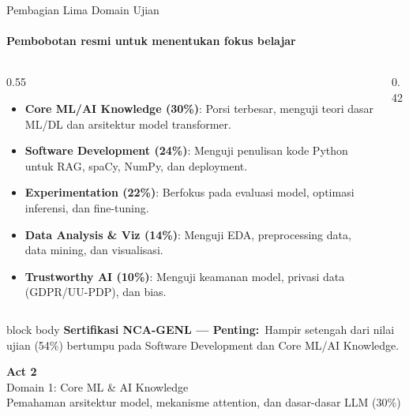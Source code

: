 \documentclass[aspectratio=169,t]{beamer}
\newcommand{\acttitle}[3]{%
  \begin{frame}[plain]
    \vspace{1.5cm}
    \begin{center}
      {\color{nvgreen}\Huge\bfseries Act #1}\\[1.2em]
      {\color{nvwhite}\Huge #2}\\[0.8em]
      {\color{nvgray}\Large #3}
    \end{center}
  \end{frame}%
}
\newcommand{\certnote}[2]{%
  \vspace{0.1em}
  \begin{beamercolorbox}[rounded=true,shadow=false,sep=4pt]{block body}
    {\scriptsize\color{nvblue}\textbf{Sertifikasi NCA-GENL --- #1:}}\,
    {\scriptsize\color{nvgray}#2}
  \end{beamercolorbox}%
}
\begin{document}
\begin{frame}{Pembagian Lima Domain Ujian}
  \framesubtitle{Pembobotan resmi untuk menentukan fokus belajar}
  \begin{columns}[T]
    \begin{column}{0.55\textwidth}
      \begin{itemize}\footnotesize
        \item \textbf{Core ML/AI Knowledge (30\%)}: Porsi terbesar, menguji teori dasar ML/DL dan arsitektur model transformer.
        \item \textbf{Software Development (24\%)}: Menguji penulisan kode Python untuk RAG, spaCy, NumPy, dan deployment.
        \item \textbf{Experimentation (22\%)}: Berfokus pada evaluasi model, optimasi inferensi, dan fine-tuning.
        \item \textbf{Data Analysis \& Viz (14\%)}: Menguji EDA, preprocessing data, data mining, dan visualisasi.
        \item \textbf{Trustworthy AI (10\%)}: Menguji keamanan model, privasi data (GDPR/UU-PDP), dan bias.
      \end{itemize}
    \end{column}
    \begin{column}{0.42\textwidth}
      \begin{center}
      \end{center}
    \end{column}
  \end{columns}
  \certnote{Penting}{Hampir setengah dari nilai ujian (54\%) bertumpu pada Software Development dan Core ML/AI Knowledge.}
\end{frame}

\acttitle{2}{Domain 1: Core ML \& AI Knowledge}{Pemahaman arsitektur model, mekanisme attention, dan dasar-dasar LLM (30\%)}
\end{document}
